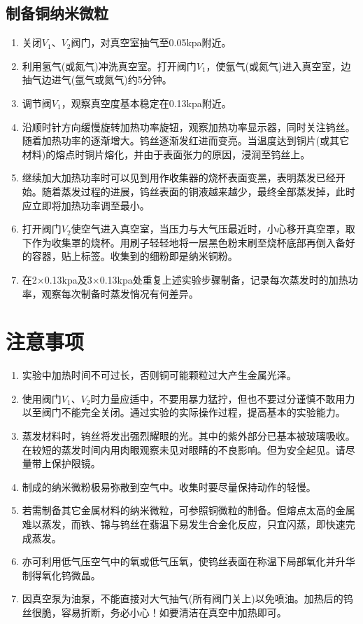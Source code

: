 \documentclass[a4paper]{article}
\begin{document}
\subsection{制备铜纳米微粒}
\begin{enumerate}
\item 关闭$V_1$、$V_2$阀门，对真空室抽气至0.05kpa附近。
\item 利用氢气(或氮气)冲洗真空室。打开阀门$V_1$，使氩气(或氮气)进入真空室，边抽气边进气(氩气或氮气)约5分钟。
\item 调节阀$V_1$，观察真空度基本稳定在0.13kpa附近。
\item 沿顺时针方向缓慢旋转加热功率旋钮，观察加热功率显示器，同时关注钨丝。随着加热功率的逐渐增大。钨丝逐渐发红进而变亮。当温度达到铜片(或其它材料)的熔点时铜片熔化，并由于表面张力的原因，浸润至钨丝上。
\item 继续加大加热功率时可以见到用作收集器的烧杯表面变黑，表明蒸发已经开始。随着蒸发过程的进展，钨丝表面的铜液越来越少，最终全部蒸发掉，此时应立即将加热功率调至最小。
\item 打开阀门$V_2$使空气进入真空室，当压力与大气压最近时，小心移开真空罩，取下作为收集罩的烧杯。用刷子轻轻地将一层黑色粉末刷至烧杯底部再倒入备好的容器，贴上标签。收集到的细粉即是纳米铜粉。
\item 在2$\times$0.13kpa及3$\times$0.13kpa处重复上述实验步骤制备，记录每次蒸发时的加热功率，观察每次制备时蒸发悄况有何差异。
\end{enumerate}

\section{注意事项}
\begin{enumerate}
\item 实验中加热时间不可过长，否则铜可能颗粒过大产生金属光泽。
\item 使用阀门$V_1$、$V_2$时力量应适中，不要用暴力猛拧，但也不要过分谨慎不敢用力以至阀门不能完全关闭。通过实验的实际操作过程，提高基本的实验能力。
\item 蒸发材料时，钨丝将发出强烈耀眼的光。其中的紫外部分已基本被玻璃吸收。在较短的蒸发时间内用肉眼观察未见对眼睛的不良影响。但为安全起见。请尽量带上保护限镜。
\item 制成的纳米微粉极易弥散到空气中。收集时要尽量保持动作的轻慢。
\item 若需制备其它金属材料的纳米微粒，可参照铜微粒的制备。但熔点太高的金属难以蒸发，而铁、锦与钨丝在翡温下易发生合金化反应，只宜闪蒸，即快速完成蒸发。
\item 亦可利用低气压空气中的氧或低气压氧，使钨丝表面在称温下局部氧化并升华制得氧化钨微晶。
\item 因真空泵为油泵，不能直接对大气抽气(所有阀门关上)以免喷油。加热后的钨丝很脆，容易折断，务必小心！如要清洁在真空中加热即可。
\end{enumerate}
\end{document}
